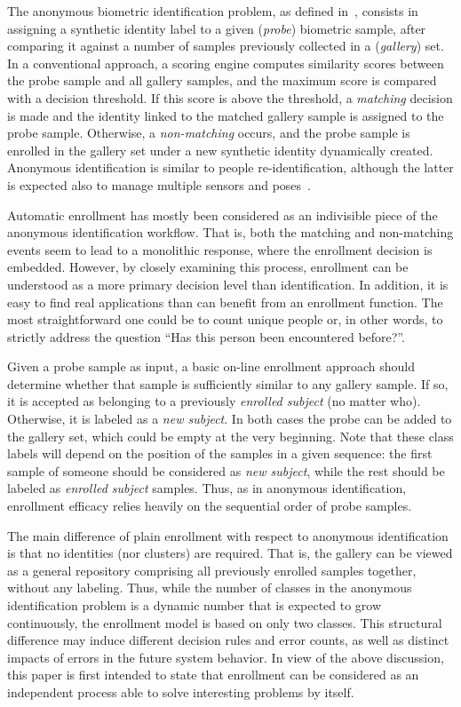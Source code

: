 \documentclass{llncs}
\begin{document}
The anonymous biometric identification problem, as defined in~\cite{DeCann:2012}, consists in assigning a synthetic identity label to a given (\emph{probe}) biometric sample, after comparing it against a number of samples previously collected in a (\emph{gallery}) set. In a conventional approach, a scoring engine computes similarity scores between the probe sample and all gallery samples, and the maximum score is compared with a decision threshold. If this score is above the threshold, a \emph{matching} decision is made and the identity linked to the matched gallery sample is assigned to the probe sample. Otherwise, a \emph{non-matching} occurs, and the probe sample is enrolled in the gallery set under a new synthetic identity dynamically created. Anonymous identification is similar to people re-identification, although the latter is expected also to manage multiple sensors and poses~\cite{Zheng:2011,Roy:2012}.

Automatic enrollment has mostly been considered as an indivisible piece of the anonymous identification workflow. That is, both the matching and non-matching events seem to lead to a monolithic response,  where the enrollment decision is embedded. However, by closely examining this process, enrollment can be understood as a more primary decision level than identification. In addition, it is easy to find real applications than can benefit from an enrollment function. The most straightforward one could be to count unique people or, in other words, to strictly address the question ``Has this person been encountered before?''\cite{DeCann:2012}. 

Given a probe sample as input, a basic on-line enrollment approach should determine whether that sample is sufficiently similar to any gallery sample. If so, it is accepted as belonging to a previously \emph{enrolled subject} (no matter who). Otherwise, it is labeled as a \emph{new subject}. In both cases the probe can be added to the gallery set, which could be empty at the very beginning. Note that these class labels 
will depend on the position of the samples in a given sequence: the first sample of someone should be considered as \emph{new subject}, while the rest should be labeled as \emph{enrolled subject} samples. Thus, as in anonymous identification, enrollment efficacy relies heavily on the sequential order of probe samples. 

The main difference of plain enrollment with respect to anonymous identification is that no identities (nor clusters) are required. That is, the gallery can be viewed as a general repository comprising all previously enrolled samples together, without any labeling. Thus, while the number of classes in the anonymous identification problem is a dynamic number that is expected to grow continuously, the enrollment model is based on only two classes. This structural difference may induce different decision rules and error counts, as well as distinct impacts of errors in the future system behavior. In view of the above discussion, this paper is first intended to state that enrollment can be considered as an independent process able to solve interesting problems by itself. 
\end{document}
